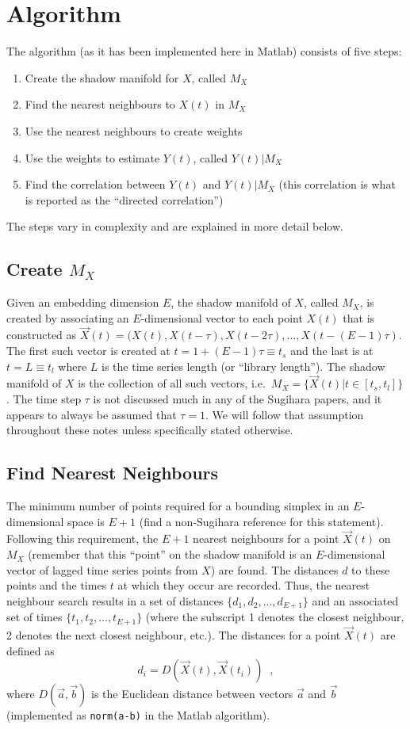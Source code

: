 \documentclass[a4paper,11pt]{article}
\begin{document}
\section{Algorithm}
The algorithm (as it has been implemented here in Matlab) consists of five steps:
\begin{enumerate}
\item Create the shadow manifold for $X$, called $M_X$
\item Find the nearest neighbours to $X(t)$ in $M_X$
\item Use the nearest neighbours to create weights
\item Use the weights to estimate $Y(t)$, called $Y(t)|M_X$
\item Find the correlation between $Y(t)$ and $Y(t)|M_X$ (this correlation is what is reported as the ``directed correlation'')
\end{enumerate}
The steps vary in complexity and are explained in more detail below.

\subsection{Create $M_X$}
Given an embedding dimension $E$, the shadow manifold of $X$, called $M_X$, is created by associating an $E$-dimensional vector to each point $X(t)$ that is constructed as $\vec{X}(t)=(X(t),X(t-\tau),X(t-2\tau),\ldots,X(t-(E-1)\tau)$.  The first such vector is created at $t=1+(E-1)\tau\equiv t_s$ and the last is at $t=L\equiv t_l$ where $L$ is the time series length (or ``library length'').  The shadow manifold of $X$ is the collection of all such vectors, i.e.\ $M_X=\{\vec{X}(t) | t\in[t_s,t_l]\}$.  The time step $\tau$ is not discussed much in any of the Sugihara papers, and it appears to always be assumed that $\tau=1$.  We will follow that assumption throughout these notes unless specifically stated otherwise.    

\subsection{Find Nearest Neighbours}
The minimum number of points required for a bounding simplex in an $E$-dimensional space is $E+1$ (find a non-Sugihara reference for this statement).  Following this requirement, the $E+1$ nearest neighbours for a point $\vec{X}(t)$ on $M_X$ (remember that this ``point'' on the shadow manifold is an $E$-dimensional vector of lagged time series points from $X$) are found. The distances $d$ to these points and the times $t$ at which they occur are recorded.  Thus, the nearest neighbour search results in a set of distances $\{d_1,d_2,\ldots,d_{E+1}\}$ and an associated set of times $\{t_1,t_2,\ldots,t_{E+1}\}$ (where the subscript 1 denotes the closest neighbour, 2 denotes the next closest neighbour, etc.).  The distances for a point $\vec{X}(t)$ are defined as
$$
d_i = D\left(\vec{X}(t),\vec{X}(t_i)\right)\;\;,
$$
where $D(\vec{a},\vec{b})$ is the Euclidean distance between vectors $\vec{a}$ and $\vec{b}$ (implemented as {\tt norm(a-b)} in the Matlab algorithm).
\end{document}
